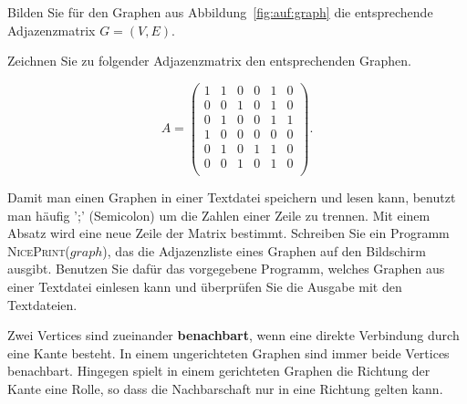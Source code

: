 \begin{aufg}
Bilden Sie für den Graphen aus Abbildung~\ref{fig:auf:graph} die entsprechende Adjazenzmatrix $G=(V,E)$.
\end{aufg}



\begin{aufg}
Zeichnen Sie zu folgender Adjazenzmatrix den entsprechenden Graphen.


\[A =  \begin{pmatrix}
  1 & 1 & 0 & 0 & 1 & 0 \\
  0 & 0 & 1 & 0 & 1 & 0 \\
  0 & 1 & 0 & 0 & 1 & 1 \\
  1 & 0 & 0 & 0 & 0 & 0 \\
  0 & 1 & 0 & 1 & 1 & 0 \\
  0 & 0 & 1 & 0 & 1 & 0 \\
 \end{pmatrix}.
  \]
  
\end{aufg}

\begin{aufg}
Damit man einen Graphen in einer Textdatei speichern und lesen kann, benutzt man häufig ';' (Semicolon) um die Zahlen einer Zeile zu trennen. 
Mit einem Absatz wird eine neue Zeile der Matrix bestimmt. 
Schreiben Sie ein Programm \textsc{NicePrint($graph$)}, das die Adjazenzliste eines Graphen auf den Bildschirm ausgibt.
Benutzen Sie dafür das vorgegebene Programm, welches Graphen aus einer Textdatei einlesen kann und überprüfen Sie die Ausgabe mit den Textdateien.
\end{aufg}


\begin{mdef}
Zwei Vertices sind zueinander \textbf{benachbart}, wenn eine direkte Verbindung durch eine Kante besteht. 
In einem ungerichteten Graphen sind immer beide Vertices benachbart. 
Hingegen spielt in einem gerichteten Graphen die Richtung der Kante eine Rolle, so dass die Nachbarschaft nur in eine Richtung gelten kann.
\end{mdef}

